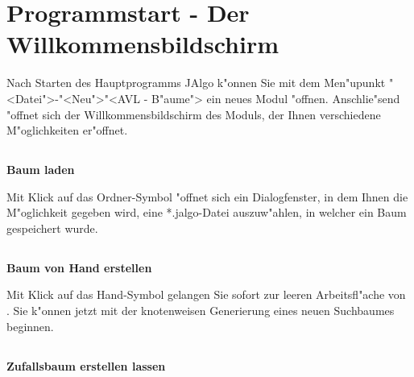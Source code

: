 


\section{Programmstart - Der Willkommensbildschirm}

\medskip
Nach Starten des Hauptprogramms JAlgo k"onnen Sie mit dem Men"upunkt {\sc "<Datei">\--"<Neu">\-"<AVL - B"aume">} ein 
neues Modul "offnen. Anschlie"send "offnet sich der Willkommensbildschirm des Moduls, der Ihnen verschiedene
M"oglichkeiten er"offnet. \\

\bigskip
\bigskip
{}

\newpage
\subsection[Baum laden]{ }
\vspace{-4.3ex} {\bf {\large  \qquad \qquad Baum laden}} 


Mit Klick auf das Ordner-Symbol "offnet sich ein Dialogfenster, in dem Ihnen die M"oglichkeit 
gegeben wird, eine *.jalgo-Datei auszuw"ahlen, in welcher ein Baum gespeichert wurde.  \\


\medskip
\subsection[Baum von Hand erstellen]{} 
\vspace{-4.3ex} {\bf {\large  \qquad \qquad Baum von Hand erstellen}} 


Mit Klick auf das Hand-Symbol gelangen Sie sofort zur leeren Arbeitsfl"ache von \AVL .
Sie k"onnen jetzt mit der knotenweisen Generierung eines neuen Suchbaumes beginnen.

\medskip
\subsection[Zufallsbaum erstellen lassen]{}  
\vspace{-4.3ex} {\bf {\large  \qquad \qquad Zufallsbaum erstellen lassen}} 


